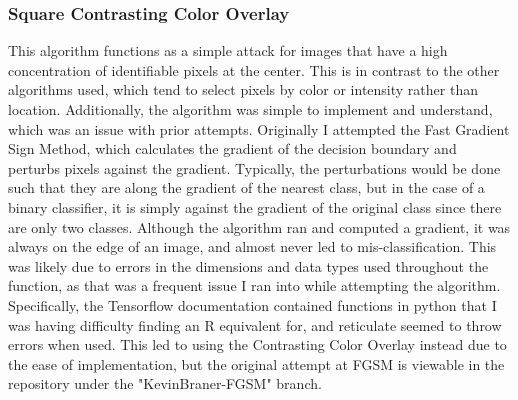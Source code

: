 \documentclass{article}
\begin{document}
\subsubsection{Square Contrasting Color Overlay}
This algorithm functions as a simple attack for images that have a high concentration of identifiable pixels at the center. This is in contrast to the other algorithms used, which tend to select pixels by color or intensity rather than location. Additionally, the algorithm was simple to implement and understand, which was an issue with prior attempts. Originally I attempted the Fast Gradient Sign Method, which calculates the gradient of the decision boundary and perturbs pixels against the gradient. Typically, the perturbations would be done such that they are along the gradient of the nearest class, but in the case of a binary classifier, it is simply against the gradient of the original class since there are only two classes. Although the algorithm ran and computed a gradient, it was always on the edge of an image, and almost never led to mis-classification. This was likely due to errors in the dimensions and data types used throughout the function, as that was a frequent issue I ran into while attempting the algorithm. Specifically, the Tensorflow documentation contained functions in python that I was having difficulty finding an R equivalent for, and reticulate seemed to throw errors when used. This led to using the Contrasting Color Overlay instead due to the ease of implementation, but the original attempt at FGSM is viewable in the repository under the "KevinBraner-FGSM" branch.
\end{document}
